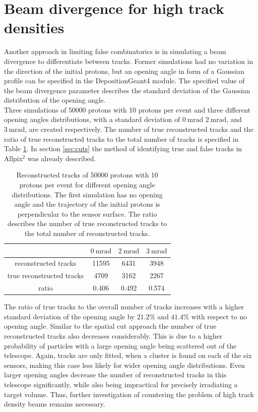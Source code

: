 \section{Beam divergence for high track densities}
Another approach in limiting false combinatorics is in simulating a beam divergence to differentiate between tracks. Former simulations had no variation
in the direction of the initial protons, but an opening angle in form of a Gaussian profile can be specified in the DepositionGeant4 module. The specified value of
the beam divergence parameter describes the standard deviation of the Gaussian distribution of the opening angle.  \\
Three simulations of 50000 protons with 10 protons per event and three different opening angles distributions, with a standard deviation of $\SI{0}{\milli\radian}$
$\SI{2}{\milli\radian}$, and $\SI{3}{\milli\radian}$, are created respectively.
The number of true reconstructed tracks and the ratio
of true reconstructed tracks to the total number of tracks is specified in Table \ref{tab:angle}. In section \ref{sec:cuts} the method of identifying
true and false tracks in Allpix$^2$ was already described.

\begin{table}
  \centering
  \caption{Reconstructed tracks of 50000 protons with 10 protons per event for different opening angle
  distributions. The first simulation has no opening angle and the trajectory of the initial protons is perpendicular to the sensor surface.
  The ratio describes the number of true reconstructed tracks to the total number of reconstructed tracks.}
  \begin{tabular}{c | c c c}
    \toprule
     &  $\SI{0}{\milli\radian}$ & $\SI{2}{\milli\radian}$ & $\SI{3}{\milli\radian}$\\
    \midrule
    reconstructed tracks & 11595 & 6431 & 3948  \\
    true reconstructed tracks & 4709 & 3162 & 2267 \\
    ratio & 0.406 & 0.492 & 0.574
  \end{tabular}
  \label{tab:angle}
\end{table}

The ratio of true tracks to the overall number of tracks increases with a higher standard deviation of the opening angle by $21.2\%$ and $41.4\%$ with respect to
no opening angle. Similar to the spatial cut approach the
number of true reconstructed tracks also decreases considerably. This is due to a higher probability of particles with a large opening angle being scattered out of the telescope.
Again, tracks are only fitted, when a cluster is found on each of the six sensors, making this case less likely for wider opening angle distributions.
Even larger opening angles decrease the number of reconstructed tracks in this telescope significantly, while also being impractical for precisely irradiating a target volume.
Thus, further investigation of countering the problem of high track density beams remains necessary.

